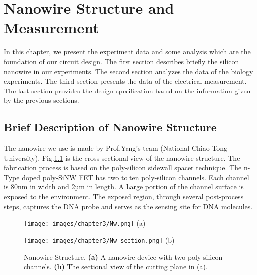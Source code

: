 \chapter{Nanowire Structure and Measurement}
In this chapter, we present the experiment data and some analysis which are the foundation of our circuit design.
The first section describes briefly the silicon nanowire in our experiments.
The second section analyzes the data of the biology experiments.
The third section presents the data of the electrical measurement.
The last section provides the design specification based on the information given by the previous sections.

\section{Brief Description of Nanowire Structure}
The nanowire we use is made by Prof.Yang's team (National Chiao Tong University)\cite{C5}.
Fig.\ref{fig:drawing} is the cross-sectional view of the nanowire structure.
The fabrication process is based on the poly-silicon sidewall spacer technique.
The n-Type doped poly-SiNW FET has two to ten poly-silicon channels.
Each channel is 80nm in width and 2µm in length.
A Large portion of the channel surface is exposed to the environment.
The exposed region, through several post-process steps, captures the DNA probe and serves as the sensing site for DNA molecules.\cite{C5, C6}


\begin{figure}[!htbp]
    \centering
    \begin{minipage}[t]{0.4\textwidth}
        \texttt{[image: images/chapter3/Nw.png]}
        \raggedleft
        (a)
    \end{minipage}
    \hfill
    \begin{minipage}[t]{0.4\textwidth}
        \texttt{[image: images/chapter3/Nw\_section.png]}
        \raggedleft
        (b)
    \end{minipage}
    \caption{Nanowire Structure.  \textbf{(a)} A nanowire device with two poly-silicon channels. \textbf{(b)} The sectional view of the cutting plane in (a). }
    \label{fig:drawing}
\end{figure}


